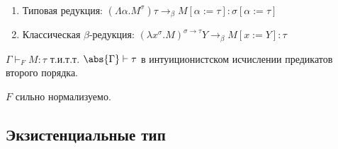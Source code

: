 \begin{definition} \ 
    \begin{enumerate}[label=(\asbuk*)]
        \item Типовая редукция: $\left(\Lambda \alpha . M^\sigma\right) \tau \rightarrow_\beta M[\alpha:=\tau] : \sigma[\alpha := \tau]$
        \item Классическая $\beta$-редукция: $\left(\lambda x^\sigma . M\right)^{\sigma \rightarrow \tau} Y \rightarrow_\beta M [x:=Y] : \tau$
    \end{enumerate}
\end{definition}

\begin{theorem}
    $\Gamma \vdash_F M :\tau$ т.и.т.т. $\abs{\Gamma} \vdash \tau$ в интуиционистском исчислении предикатов второго порядка.
\end{theorem}

\begin{theorem}
    $F$ сильно нормализуемо.
\end{theorem}

\subsection{\texorpdfstring{Экзистенциальные тип}{Existential types}}
